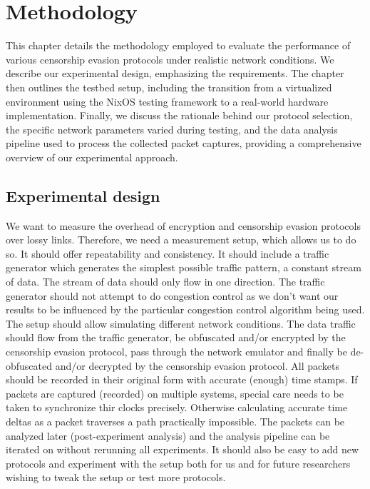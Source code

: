 
\chapter{Methodology}
\label{chap:methodology}

This chapter details the methodology employed to evaluate the performance of various censorship evasion protocols under realistic network conditions.
We describe our experimental design, emphasizing the requirements.
The chapter then outlines the testbed setup, including the transition from a virtualized environment using the NixOS testing framework to a real-world hardware implementation.
Finally, we discuss the rationale behind our protocol selection, the specific network parameters varied during testing, and the data analysis pipeline used to process the collected packet captures, providing a comprehensive overview of our experimental approach.

\section{Experimental design}
We want to measure the overhead of encryption and censorship evasion protocols over lossy links.
Therefore, we need a measurement setup, which allows us to do so.
It should offer repeatability and consistency.
It should include a traffic generator which generates the simplest possible traffic pattern, a constant stream of data.
The stream of data should only flow in one direction.
The traffic generator should not attempt to do congestion control as we don't want our results to be influenced by the particular congestion control algorithm being used.
The setup should allow simulating different network conditions.
The data traffic should flow from the traffic generator, be obfuscated and/or encrypted by the censorship evasion protocol, pass through the network emulator and finally be de-obfuscated and/or decrypted by the censorship evasion protocol.
All packets should be recorded in their original form with accurate (enough) time stamps.
If packets are captured (recorded) on multiple systems, special care needs to be taken to synchronize thir clocks precisely.
Otherwise calculating accurate time deltas as a packet traverses a path practically impossible.
The packets can be analyzed later (post-experiment analysis) and the analysis pipeline can be iterated on without rerunning all experiments.
It should also be easy to add new protocols and experiment with the setup both for us and for future researchers wishing to tweak the setup or test more protocols.

